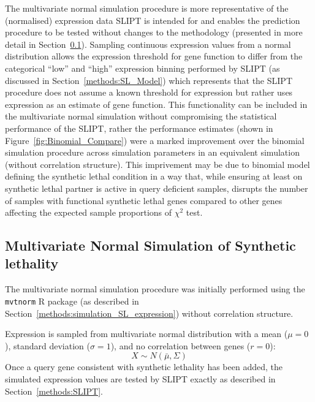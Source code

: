 The multivariate normal simulation procedure is more representative of the (normalised) expression data \gls{SLIPT} is intended for and enables the prediction procedure to be tested without changes to the methodology (presented in more detail in Section~\ref{chapt2:simulation_mvtnorm}). Sampling continuous expression values from a normal distribution allows the expression threshold for gene function to differ from the categorical ``low'' and ``high'' expression binning performed by \gls{SLIPT} (as discussed in Section~\ref{methods:SL_Model}) which represents that the \gls{SLIPT} procedure does not assume a known threshold for expression but rather uses expression as an estimate of gene function. This functionality can be included in the multivariate normal simulation without compromising the statistical performance of the \gls{SLIPT}, rather the performance estimates (shown in Figure~\ref{fig:Binomial_Compare}) were a marked improvement over the binomial simulation procedure across simulation parameters in an equivalent simulation (without correlation structure). This imprivement may be due to binomial model defining the synthetic lethal condition in a way that, while ensuring at least on synthetic lethal partner is active in query deficient samples, disrupts the number of samples with functional synthetic lethal genes compared to other genes affecting the expected sample proportions of $\chi^2$ test.

\FloatBarrier

\subsection{Multivariate Normal Simulation of Synthetic lethality} \label{chapt2:simulation_mvtnorm}

The multivariate normal simulation procedure was initially performed using the \texttt{mvtnorm} R package \citep{Genz2009, mvtnorm} (as described in Section~\ref{methods:simulation_SL_expression}) without correlation structure.

Expression is sampled from multivariate normal distribution with a mean ($\mu = 0$), standard deviation ($\sigma = 1$), and no correlation between genes ($r = 0$): $$X\sim N(\bar{\mu},\Sigma)$$  Once a query gene consistent with synthetic lethality has been added, the simulated expression values are tested by \gls{SLIPT} exactly as described in Section~\ref{methods:SLIPT}.

